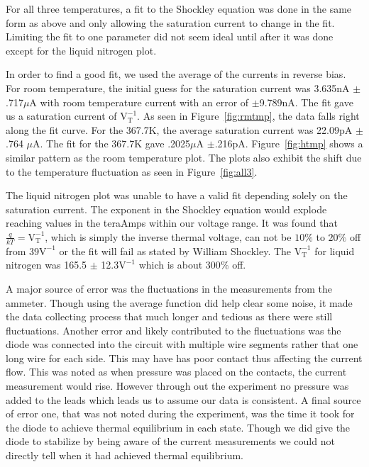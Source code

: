 \documentclass[11pt,letterpaper,onecolumn]{article}
\begin{document}
For all three temperatures, a fit to the Shockley equation was done in the same form as above and only allowing the saturation current to change in the fit. Limiting the fit to one parameter did not seem ideal until after it was done except for the liquid nitrogen plot.

In order to find a good fit, we used the average of the currents in reverse bias. For room temperature, the initial guess for the saturation current was 3.635nA  $\pm$.717$\mu$A with room temperature current with an error of $\pm$9.789nA. The fit gave us a saturation current of  $\text{V}_\text{T}^{-1}$. As seen in Figure~\ref{fig:rmtmp}, the data falls right along the fit curve. For the 367.7K, the average saturation current was 22.09pA $\pm$.764 $\mu$A. The fit for the 367.7K gave .2025$\mu$A $\pm$.216pA. Figure~\ref{fig:htmp} shows a similar pattern as the room temperature plot. The plots also exhibit the shift due to the temperature fluctuation as seen in Figure~\ref{fig:all3}. 

The liquid nitrogen plot was unable to have a valid fit depending solely on the saturation current. The exponent in the Shockley equation would explode reaching values in the teraAmps within our voltage range. It was found that $\frac{q}{kT}= \text{V}_\text{T}^{-1}$, which is simply the inverse thermal voltage, can not be $10\%$ to $20\%$ off from 39$\text{V}^{-1}$ or the fit will fail as stated by William Shockley. The $\text{V}_\text{T}^{-1}$ for liquid nitrogen was 165.5 $\pm$ 12.3$\text{V}^{-1}$ which is about 300$\%$ off.~\cite{Shock} 

A major source of error was the fluctuations in the measurements from the ammeter. Though using the average function did help clear some noise, it made the data collecting process that much longer and tedious as there were still fluctuations. Another error and likely contributed to the fluctuations was the diode was connected into the circuit with multiple wire segments rather that one long wire for each side. This may have has poor contact thus affecting the current flow. This was noted as when pressure was placed on the contacts, the current measurement would rise. However through out the experiment no pressure was added to the leads which leads us to assume our data is consistent. A final source of error one, that was not noted during the experiment, was the time it took for the diode to achieve thermal equilibrium in each state. Though we did give the diode to stabilize by being aware of the current measurements we could not directly tell when it had achieved thermal equilibrium.
\end{document}

